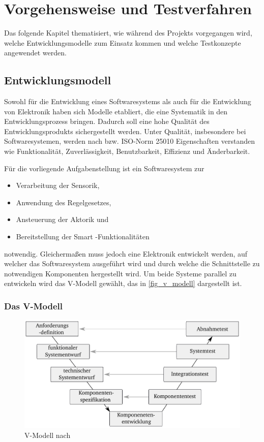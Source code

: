 \chapter{Vorgehensweise und Testverfahren}\label{kap3}
Das folgende Kapitel thematisiert, wie während des Projekts vorgegangen wird, welche Entwicklungsmodelle zum Einsatz kommen und welche Testkonzepte angewendet werden.

\section{Entwicklungsmodell}
Sowohl für die Entwicklung eines Softwaresystems als auch für die Entwicklung von Elektronik haben sich Modelle etabliert, die eine Systematik in den Entwicklungsprozess bringen. Dadurch soll eine hohe Qualität des Entwicklungsprodukts sichergestellt werden. 
Unter Qualität, insbesondere bei Softwaresystemen, werden nach \cite{BasSof} bzw. ISO-Norm 25010 \cite{ISO_25010} Eigenschaften verstanden wie Funktionalität, Zuverlässigkeit, Benutzbarkeit, Effizienz und Änderbarkeit.

Für die vorliegende Aufgabenstellung ist ein Softwaresystem zur
\begin{itemize}
	\item Verarbeitung der Sensorik,
	\item Anwendung des Regelgesetzes,
	\item Ansteuerung der Aktorik und
	\item Bereitstellung der \glqq Smart\grqq{} -Funktionalitäten
\end{itemize}
notwendig. Gleichermaßen muss jedoch eine Elektronik entwickelt werden, auf welcher das Softwaresystem ausgeführt wird und durch welche die Schnittstelle zu notwendigen Komponenten hergestellt wird. Um beide Systeme parallel zu entwickeln wird das V-Modell gewählt, das in \autoref{fig_v_modell} dargestellt ist. 



\subsection{Das V-Modell}

\begin{figure}%
\includegraphics[width=\columnwidth]{./Bilder/fig_v_modell}%
\caption{V-Modell nach \cite{Boehm79}}%
\label{fig_v_modell}%
\end{figure}

